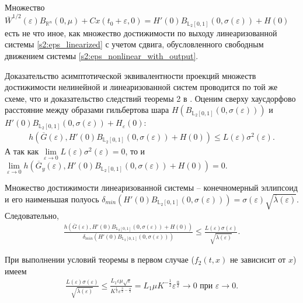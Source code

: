 \documentclass[../main.tex]{subfiles}
\begin{document}
    Множество $\overline{W}^{1/2}(\varepsilon)B_{\mathbb{R}^n}(0,\mu) + Cx(t_0+\varepsilon,0)  = H'(0)B_{\mathbb{L}_2[0,1]}(0,\sigma(\varepsilon))+ H(0)$ есть не что иное, как множество достижимости по выходу линеаризованной системы \eqref{s2:eps_linearized} с учетом сдвига, обусловленного свободным движением системы \eqref{s2:eps_nonlinear_with_output}.
    
    Доказательство асимптотической эквивалентности проекций множеств достижимости нелинейной и линеаризованной систем проводится по той же схеме, что и доказательство следствий теоремы 2 в \cite{GusevUMJ}. 
Оценим сверху хаусдорфово расстояние между образами гильбертова шара $ H\left( B_{\mathbb{L}_2[0,1]}(0,\sigma(\varepsilon))\right)  $ и $ H'(0)B_{\mathbb{L}_2[0,1]}(0,\sigma(\varepsilon))+ H_{\varepsilon}(0) $:
    \begin{gather*}
        h\left( \overline{G}(\varepsilon), H'(0)B_{\mathbb{L}_2[0,1]}(0,\sigma(\varepsilon))+ H(0)\right)  \leqslant L(\varepsilon) \sigma^2(\varepsilon).
    \end{gather*}
    А так как $ \lim\limits_{\varepsilon \rightarrow 0}  L(\varepsilon) \sigma^2(\varepsilon) = 0 $, то и $ \lim\limits_{\varepsilon \rightarrow 0} h\left( \overline{G}_y(\varepsilon), H'(0)B_{\mathbb{L}_2[0,1]}(0,\sigma(\varepsilon))+ H(0)\right)  = 0 $.
    
    
    Множество достижимости линеаризованной системы -- конечномерный эллипсоид и его наименьшая полуось $ \delta_{min}\left(H'(0)B_{\mathbb{L}_2[0,1]}(0,\sigma(\varepsilon)) \right)=\sigma(\varepsilon)\sqrt{\overline{\lambda}(\varepsilon)} $. 
    Следовательно,
    \begin{gather*}
        \frac{h\left(\overline{G}(\varepsilon), H'(0)B_{\mathbb{L}_2[0,1]}(0,\sigma(\varepsilon))+ H(0)\right) }{\delta_{min}\left( H'(0)B_{\mathbb{L}_2[0,1]}(0,\sigma(\varepsilon))\right) } \leqslant \frac{L(\varepsilon) \sigma(\varepsilon)}{\sqrt{\overline{\lambda}(\varepsilon)}}.
    \end{gather*}
    
    При выполнении условий теоремы в первом случае ($ f_2(t,x) $ не зависисит от $ x $) имеем
    \begin{gather*}
        \frac{L(\varepsilon) \sigma(\varepsilon)}{\sqrt{\overline{\lambda}(\varepsilon)}} 
        \leqslant
        \frac{L_1\varepsilon\mu\sqrt{\varepsilon}}{K^{\frac{1}{2}}\varepsilon^{\frac{3}{2}-\frac{\alpha}{2}}} 
        =
        L_1\mu K^{-\frac{1}{2}}\varepsilon^{\frac{\alpha}{2}} \rightarrow 0 \mbox{\ при\ } \varepsilon \rightarrow 0.
    \end{gather*}
    
\end{document}
